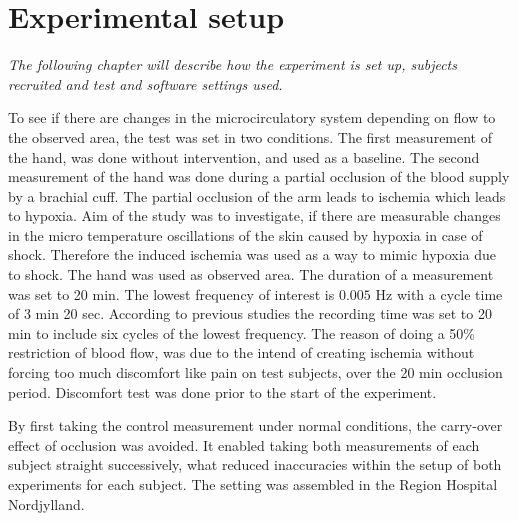 \chapter{Experimental setup}

\textit{The following chapter will describe how the experiment is set up, subjects recruited and test and software settings used.} 


To see if there are changes in the microcirculatory system depending on flow to the observed area, the test was set in two conditions. The first measurement of the hand, was done without intervention, and used as a baseline. The second measurement of the hand was done during a partial occlusion of the blood supply by a brachial cuff. The partial occlusion of the arm leads to ischemia which leads to hypoxia\cite{martini2012}. Aim of the study was to investigate, if there are measurable changes in the micro temperature oscillations of the skin caused by hypoxia in case of shock. Therefore the induced ischemia was used as a way to mimic hypoxia due to shock. The hand was used as observed area. 
The duration of a measurement was set to 20 min. The lowest frequency of interest is $0.005$ Hz with a cycle time of 3 min 20 sec. According to previous studies the recording time was set to 20 min to include six cycles of the lowest frequency.\cite{sagaidachnyi2014}
The reason of doing a 50\% restriction of blood flow, was due to the intend of creating ischemia without forcing too much discomfort like pain on test subjects, over the 20 min occlusion period. Discomfort test was done prior to the start of the experiment.

By first taking the control measurement under normal conditions, the carry-over effect of occlusion was avoided. It enabled taking both measurements of each subject straight successively, what reduced inaccuracies within the setup of both experiments for each subject. The setting was assembled in the Region Hospital Nordjylland.